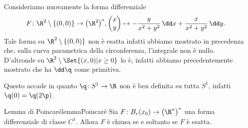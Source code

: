 \begin{ese}
	Consideriamo nuovamente la forma differenziale
	\[
		F\colon \R^2\setminus\{(0,0)\} \to \big(\R^2\big)^*, \begin{pmatrix}x\\y\end{pmatrix} \mapsto -\frac{y}{x^2+y^2}\,\dd x + \frac{x}{x^2+y^2}\,\dd y.
	\]
	Tale forma su \(\R^2\setminus\{(0,0)\}\) non è esatta infatti abbiamo mostrato in precedenza che, sulla curva parametrica della circonferenza, l'integrale non è nullo.
	D'altronde su \(\R^2\setminus\Set{(x,0) | x\ge 0}\) lo è, infatti abbiamo precedentemente mostrato che ha \(\dd \q\) come primitiva.

	Questo accade in quanto \(\q\colon S^1 \to \R\) non è ben definita su tutta \(S^1\), infatti \(\q(0)=\q(2\p)\).
\end{ese}

\begin{teor}{Lemma di Poincaré}{lemmaPoincaré}
	Sia \(F\colon B_r(x_0) \to \big(\R^n\big)^*\) una forma differenziale di classe \(C^1\).
	Allora \(F\) è chiusa se e soltanto se \(F\) è esatta.
\end{teor}

